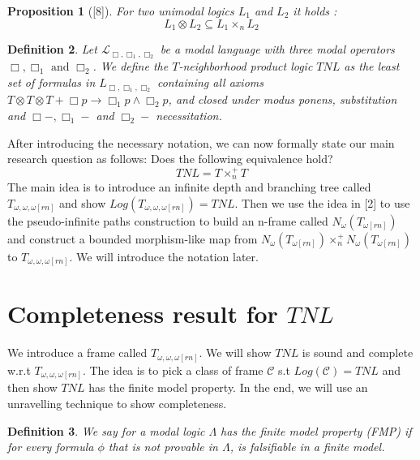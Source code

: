 \documentclass[12pt, a4paper]{scrartcl}
\newtheorem{definition}{Definition}[subsection]
\newtheorem{proposition}[definition]{Proposition}
\begin{document}
\begin{proposition}[\textnormal{[8]}]
    For two unimodal logics $L_1$ and $L_2$ it holds : 
    $$L_1 \otimes L_2 \subseteq L_1 \times_n L_2$$
\end{proposition}

\begin{definition}
    Let $\mathcal{L}_{\Box,\Box_1,\Box_2}$ be a modal language with three  modal operators $\Box, \Box_1 \mbox{ and } \Box_2$.
    We define the $T$-neighborhood product logic $\mathit{TNL}$ as the least set of formulas in $L_{\Box,\Box_1,\Box_2}$ 
    containing all axioms $T \otimes T \otimes T + \Box p \rightarrow \Box_1 p \land \Box_2 p$, and closed
    under modus ponens, substitution and $\Box- , \Box_1- $ and $\Box_2-$ necessitation. 
\end{definition}


After introducing the necessary notation, we can now formally state our main research question as follows:
Does the following equivalence hold?
$$\mathit{TNL} = T \times^+_n T$$
The main idea is to introduce an infinite depth and branching tree called $T_{\omega,\omega,\omega[rn]}$ and show $Log(T_{\omega,\omega,\omega[rn]}) = \mathit{TNL}$.
Then we use the idea in [2] to use the pseudo-infinite paths construction to build an n-frame called $N_\omega(T_{\omega[rn]})$ and construct a bounded morphism-like map 
from $N_\omega(T_{\omega[rn]}) \times^+_n N_\omega(T_{\omega[rn]})$ to $T_{\omega,\omega,\omega[rn]}$. We will introduce the notation later.

\clearpage

\section{Completeness result for $\mathit{TNL}$}

We introduce a frame called $T_{\omega, \omega, \omega[rn]}$. We will show $\mathit{TNL}$ is sound and complete w.r.t $T_{\omega, \omega, \omega[rn]}$.
The idea is to pick a class of frame $\mathcal{C}$ s.t $Log(\mathcal{C}) = \mathit{TNL}$ and then show $\mathit{TNL}$ has the finite model property.
In the end, we will use an unravelling technique to show completeness. 

\begin{definition}
    We say for a modal logic $\Lambda$ has the finite model property (FMP) if for every formula $\phi$ that is not provable in $\Lambda$,
    is falsifiable in a finite model.
        
\end{definition}
\end{document}
